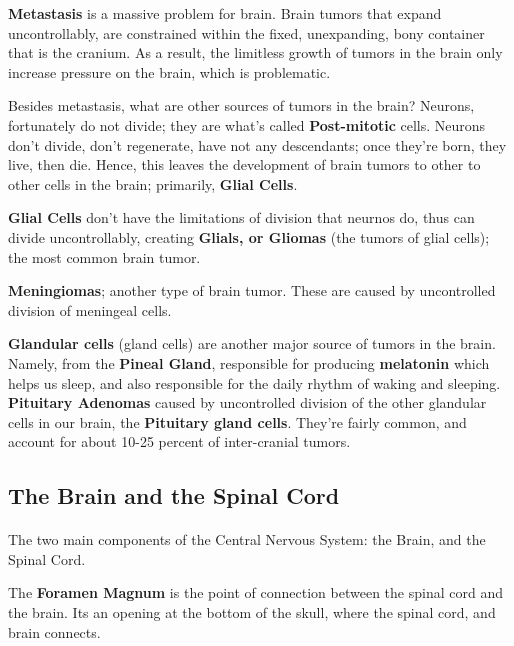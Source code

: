\documentclass[12pt, a4paper]{article}
\begin{document}
\textbf{Metastasis} is a massive problem for brain. Brain tumors that expand 
uncontrollably, are constrained within the fixed, unexpanding, bony container that is the cranium.
As a result, the limitless growth of tumors in the brain only increase pressure on the brain, which is problematic.

Besides metastasis, what are other sources of tumors in the brain? Neurons, fortunately
do not divide; they are what's called \textbf{Post-mitotic} cells. Neurons don't divide,
don't regenerate, have not any descendants; once they're born, they live, then die. Hence,
this leaves the development of brain tumors to other to other cells in the brain; primarily,
\textbf{Glial Cells}.

\textbf{Glial Cells} don't have the limitations of division that neurnos do, thus
can divide uncontrollably, creating \textbf{Glials, or Gliomas} (the tumors of glial cells); the
most common brain tumor.

\textbf{Meningiomas}; another type of brain tumor. These are caused by uncontrolled division of 
meningeal cells.

\textbf{Glandular cells} (gland cells) are another major source of tumors in the brain.
Namely, from the  \textbf{Pineal Gland}, responsible for producing \textbf{melatonin}
which helps us sleep, and also responsible for the daily rhythm of waking and sleeping.
\textbf{Pituitary Adenomas} caused by uncontrolled division of the other glandular cells in our brain,
the \textbf{Pituitary gland cells}. They're fairly common, and account for about 10-25 percent
of inter-cranial tumors.

\subsection{The Brain and the Spinal Cord}
\paragraph*{}
The two main components of the Central Nervous System: the Brain, and the Spinal Cord.

The \textbf{Foramen Magnum} is the point of connection between the spinal cord and the brain. Its an opening at the bottom of the skull,
where the spinal cord, and brain connects.
\end{document}
